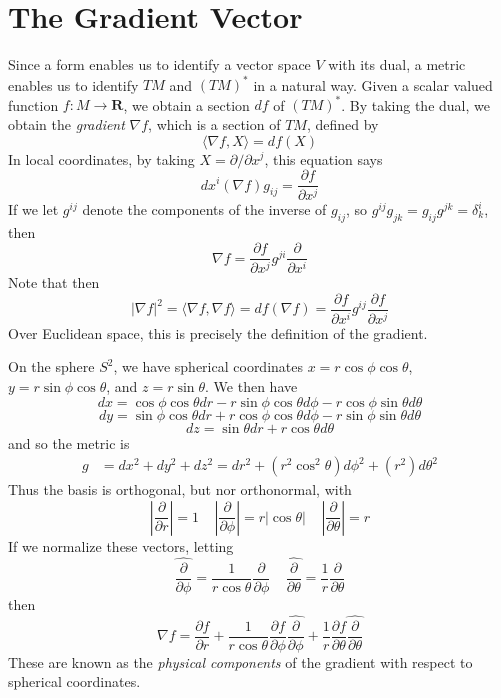 \section{The Gradient Vector}

Since a form enables us to identify a vector space $V$ with its dual, a metric enables us to identify $TM$ and $(TM)^*$ in a natural way. Given a scalar valued function $f: M \to \mathbf{R}$, we obtain a section $df$ of $(TM)^*$. By taking the dual, we obtain the \emph{gradient} $\nabla f$, which is a section of $TM$, defined by
%
\[ \langle \nabla f, X \rangle = df(X) \]
%
In local coordinates, by taking $X = \partial/\partial x^j$, this equation says
%
\[ dx^i(\nabla f) g_{ij} = \frac{\partial f}{\partial x^j} \]
%
If we let $g^{ij}$ denote the components of the inverse of $g_{ij}$, so $g^{ij} g_{jk} = g_{ij} g^{jk} = \delta^i_k$,  then
%
\[ \nabla f = \frac{\partial f}{\partial x^j} g^{ji} \frac{\partial}{\partial x^i} \]
%
Note that then
%
\[ |\nabla f|^2 = \langle \nabla f, \nabla f \rangle = df(\nabla f) = \frac{\partial f}{\partial x^i} g^{ij} \frac{\partial f}{\partial x^j} \]
%
Over Euclidean space, this is precisely the definition of the gradient.

\begin{example}
    On the sphere $S^2$, we have spherical coordinates $x = r \cos \phi \cos \theta$, $y = r \sin \phi \cos \theta$, and $z = r \sin \theta$. We then have
    \[ dx = \cos \phi \cos \theta dr - r \sin \phi \cos \theta d \phi - r \cos \phi \sin \theta d\theta \]
    \[ dy = \sin \phi \cos \theta dr + r \cos \phi \cos \theta d \phi - r \sin \phi \sin \theta d \theta \]
    \[ dz = \sin \theta dr + r \cos \theta d \theta \]
    and so the metric is
    \begin{align*}
        g &= dx^2 + dy^2 + dz^2 = dr^2 + (r^2 \cos^2 \theta) d\phi^2 + (r^2) d\theta^2
    \end{align*}
    Thus the basis is orthogonal, but nor orthonormal, with
    \[ \left|\frac{\partial}{\partial r} \right| = 1\ \ \ \ \ \left|\frac{\partial}{\partial \phi}\right| = r |\cos \theta|\ \ \ \ \ \left|\frac{\partial}{\partial \theta}\right| = r \]
    If we normalize these vectors, letting
    \[ \widehat{\frac{\partial}{\partial \phi}} = \frac{1}{r \cos \theta} \frac{\partial}{\partial \phi}\ \ \ \ \ \widehat{\frac{\partial}{\partial \theta}} = \frac{1}{r} \frac{\partial}{\partial \theta} \]
    then
    \[ \nabla f = \frac{\partial f}{\partial r} + \frac{1}{r \cos \theta} \frac{\partial f}{\partial \phi} \widehat{\frac{\partial}{\partial \phi}} + \frac{1}{r} \frac{\partial f}{\partial \theta} \widehat{\frac{\partial}{\partial \theta}} \]
    These are known as the {\it physical components} of the gradient with respect to spherical coordinates.
\end{example}

